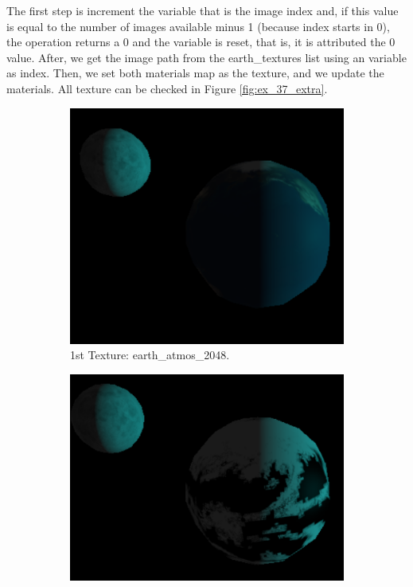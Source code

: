 \documentclass[12pt]{article}
\begin{document}
\noindent
The first step is increment the variable that is the image index and, if this value is equal to the number of images available minus 1 (because index starts in 0), the operation returns a 0 and the variable is reset, that is, it is attributed the 0 value. After, we get the image path from the earth\_textures list using an variable as index. Then, we set both materials map as the texture, and we update the materials.\newline
All texture can be checked in Figure \ref{fig:ex_37_extra}.

\begin{figure}[!h]
\centering
    \begin{subfigure}{.4\textwidth}
        \centering
        \includegraphics[width = \textwidth]{figs/ex_37_1_extra.png}
        \caption{1st Texture: earth\_atmos\_2048.}
        \label{fig:ex_37_1_extra}
    \end{subfigure}
    \begin{subfigure}{.4\textwidth}
        \centering
        \includegraphics[width = \textwidth]{figs/ex_37_2_extra.png}

\end{subfigure}
\end{figure}
\end{document}
